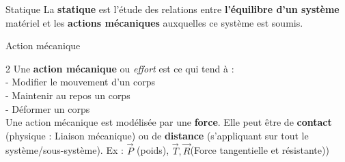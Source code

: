 \documentclass{article} %
\begin{document}
{\pagebreak
{}
{}
\vspace*{4pt}
{}
\begin{definition}{Statique}
La \textbf{statique} est l'étude des relations entre \textbf{l'équilibre d'un système} matériel et les \textbf{actions mécaniques} auxquelles ce système est soumis.
\end{definition}
\begin{definition}{Action mécanique}\vspace*{-10pt}
\begin{multicols}{2}
Une \textbf{action mécanique} ou \textit{effort} est ce qui tend à :\\
\hspace*{10pt}- Modifier le mouvement d'un corps\\
\hspace*{10pt}- Maintenir au repos un corps\\
\hspace*{10pt}- Déformer un corps\columnbreak\\
Une action mécanique est modélisée par une \textbf{force}.
Elle peut être de \textbf{contact} (physique : Liaison mécanique) ou de \textbf{distance} (s'appliquant sur tout le système/sous-système).
Ex : $\vec{P}$ (poids), $\vec{T}, \vec{R}$(Force tangentielle et résistante))
\end{multicols}
\end{definition}

}
\end{document}
